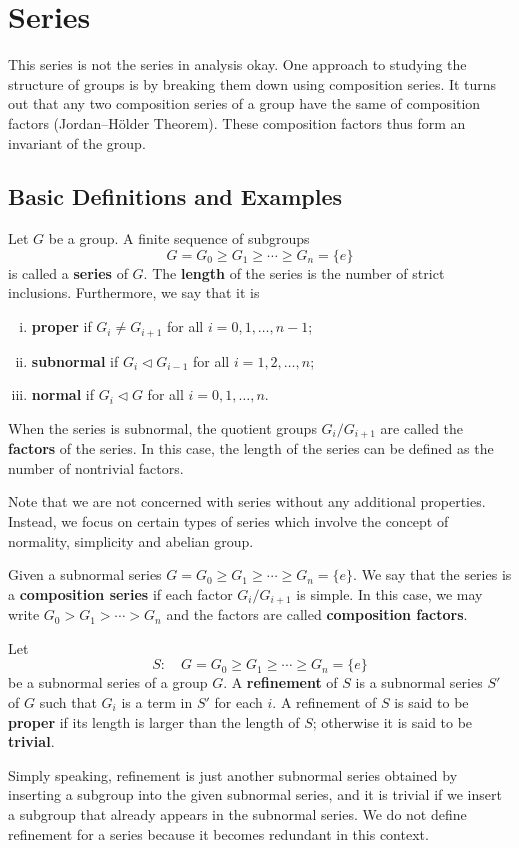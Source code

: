 \section{Series}
This series is not the series in analysis okay. One approach to studying the structure of groups is by breaking them down using composition series. It turns out that any two composition series of a group have the same of composition factors (Jordan–Hölder Theorem). These composition factors thus form an invariant of the group.
\subsection{Basic Definitions and Examples}
\begin{definition}
	Let $G$ be a group. A finite sequence of subgroups
	$$G = G_0 \geq G_1\geq \cdots \geq G_n=\{e\}$$
	is called a \textbf{series} of $G$. The \textbf{length} of the series is the number of strict inclusions. Furthermore, we say that it is 
	\begin{enumerate}[(i)]
		\item \textbf{proper} if $G_i\neq G_{i+1}$ for all $i = 0,1,\dots, n-1$;
		\item \textbf{subnormal} if $G_i\lhd G_{i-1}$ for all $i = 1,2,\dots, n$;
		\item \textbf{normal} if $G_i\lhd G$ for all $i= 0,1,\dots, n$.
	\end{enumerate}
	When the series is subnormal, the quotient groups $G_i/G_{i+1}$ are called the \textbf{factors} of the series. In this case, the length of the series can be defined as the number of nontrivial factors. 
\end{definition}
Note that we are not concerned with series without any additional properties. Instead, we focus on certain types of series which involve the concept of normality, simplicity and abelian group.
\begin{definition}
	Given a subnormal series $G = G_0 \geq G_1\geq \cdots \geq G_n = \{e\}$. We say that the series is a \textbf{composition series}  if each factor $G_i/G_{i+1}$ is simple. In this case, we may write $G_0 >G_1> \cdots > G_n$ and the factors are called \textbf{composition factors}.
\end{definition}

\begin{definition}
	Let 
	\begin{equation*}
		S: \quad G = G_0 \geq G_1\geq \cdots \geq G_n = \{e\}
	\end{equation*} be a subnormal series of a group $G$.  A \textbf{refinement} of $S$ is a subnormal series $S'$ of $G$ such that $G_i$ is a term in $S'$ for each $i$. A refinement of $S$ is said to be \textbf{proper} if its length is larger than the length of $S$; otherwise it is said to be \textbf{trivial}.
\end{definition}
Simply speaking, refinement is just another subnormal series obtained by inserting a subgroup into the given subnormal series, and it is trivial if we insert a subgroup that already appears in the subnormal series. We do not define refinement for a series because it becomes redundant in this context.

